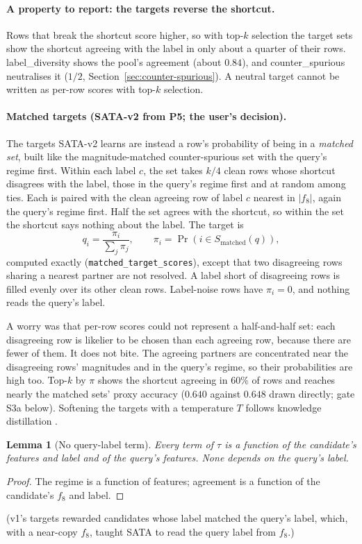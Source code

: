 \documentclass[11pt,a4paper]{article}
\newcommand{\1}{\mathbf{1}}
\theoremstyle{plain}
\newtheorem{lemma}[theorem]{Lemma}
\theoremstyle{definition}
\theoremstyle{remark}
\begin{document}
\paragraph{A property to report: the targets reverse the shortcut.} Rows
that break the shortcut score higher, so with top-$k$ selection the target
sets show the shortcut agreeing with the label in only about a quarter of
their rows. label\_diversity shows the pool's agreement (about $0.84$), and
counter\_spurious neutralises it ($1/2$, Section~\ref{sec:counter-spurious}). A
neutral target cannot be written as per-row scores with top-$k$ selection.


\paragraph{Matched targets (SATA-v2 from P5; the user's decision).} The
targets SATA-v2 learns are instead a row's probability of being in a
\emph{matched set}, built like the magnitude-matched counter-spurious set
with the query's regime first. Within each label $c$, the set takes $k/4$
clean rows whose shortcut disagrees with the label, those in the query's
regime first and at random among ties. Each is paired with the clean
agreeing row of label $c$ nearest in $|f_8|$, again the query's regime
first. Half the set agrees with the shortcut, so within the set the shortcut
says nothing about the label. The target is
\[
  q_i = \frac{\pi_i}{\sum_j \pi_j}, \qquad \pi_i = \Pr(i \in S_{\text{matched}}(q)),
\]
computed exactly (\texttt{matched\_target\_scores}), except that two
disagreeing rows sharing a nearest partner are not resolved. A label short of
disagreeing rows is filled evenly over its other clean rows. Label-noise rows
have $\pi_i = 0$, and nothing reads the query's label.

A worry was that per-row scores could not represent a half-and-half set: each
disagreeing row is likelier to be chosen than each agreeing row, because
there are fewer of them. It does not bite. The agreeing partners are
concentrated near the disagreeing rows' magnitudes and in the query's
regime, so their probabilities are high too. Top-$k$ by $\pi$ shows the
shortcut agreeing in 60\% of rows and reaches nearly the matched sets'
proxy accuracy ($0.640$ against $0.648$ drawn directly; gate S3a below).
Softening the targets with a temperature $T$ follows knowledge distillation
\citep{hinton2015distilling}.

\begin{lemma}[No query-label term]
Every term of $\tau$ is a function of the candidate's features and label
and of the query's features. None depends on the query's label.
\end{lemma}
\begin{proof}
The regime is a function of features; agreement is a function of the
candidate's $f_8$ and label.
\end{proof}
(v1's targets rewarded candidates whose label matched the query's label,
which, with a near-copy $f_8$, taught SATA to read the query label from
$f_8$.)
\end{document}
